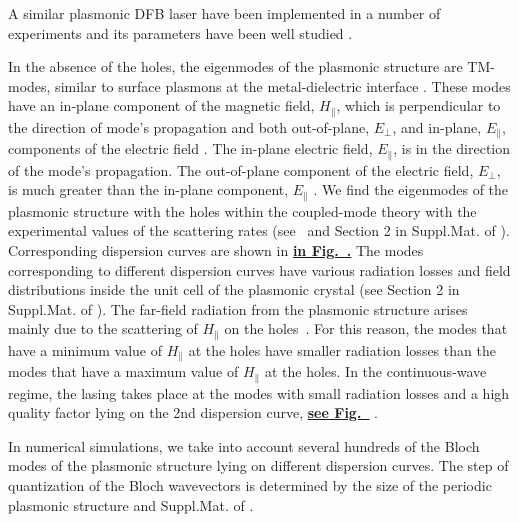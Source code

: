 \documentclass[aps,pra,amsmath,amssymb,onecolumn,superscriptaddress,showpacs,floatfix,]{revtex4-1}
\begin{document}
A similar plasmonic DFB laser have been implemented in a number of experiments \cite{BeijnumPRL,TennerJOpt,TennerACSPhot} and its parameters have been well studied \cite{BeijnumPRL,TennerJOpt,TennerACSPhot,nefedkin2018acsphot}.

In the absence of the holes, the eigenmodes of the plasmonic structure are TM-modes, similar to surface plasmons at the metal-dielectric interface \cite{TennerJOpt,TennerACSPhot}. 
These modes have an in-plane component of the magnetic field, $H_{\parallel}$, which is perpendicular to the direction of mode's propagation and both out-of-plane, $E_{\perp}$, and in-plane, $E_{\parallel}$, components of the electric field \cite{TennerJOpt,TennerACSPhot}. 
The in-plane electric field, $E_{\parallel}$, is in the direction of the mode's propagation. 
The out-of-plane component of the electric field, $E_{\perp}$, is much greater than the in-plane component, $E_{\parallel}$ \cite{TennerJOpt,TennerACSPhot}.
We find the eigenmodes of the plasmonic structure with the holes within the coupled-mode theory with the experimental values of the scattering rates (see~\cite{TennerJOpt} and Section 2 in Suppl.Mat. of \cite{nefedkin2018acsphot}). Corresponding dispersion curves are shown in \textbf{\underline{in Fig.~.}} The modes corresponding to different dispersion curves have various radiation losses and field distributions inside the unit cell of the plasmonic crystal (see Section 2 in Suppl.Mat. of \cite{nefedkin2018acsphot}). The far-field radiation from the plasmonic structure arises mainly due to the scattering of $H_{\parallel}$ on the holes~\cite{TennerJOpt}. 
For this reason, the modes that have a minimum value of $H_{\parallel}$ at the holes have smaller radiation losses than the modes that have a maximum value of $H_{\parallel}$ at the holes.
In the continuous-wave regime, the lasing takes place at the modes with small radiation losses and a high quality factor lying on the 2nd dispersion curve, \textbf{\underline{see Fig.~}} \cite{TennerJOpt,nefedkin2018acsphot}.

In numerical simulations, we take into account several hundreds of the Bloch modes of the plasmonic structure lying on different dispersion curves. The step of quantization of the Bloch wavevectors is determined by the size of the periodic plasmonic structure \cite{nefedkin2018acsphot} and Suppl.Mat. of \cite{nefedkin2018acsphot}.
\end{document}
